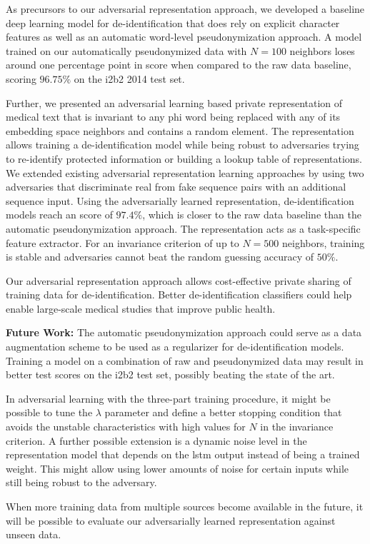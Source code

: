 %
As precursors to our adversarial representation approach, we developed a baseline deep learning model for de-identification that does rely on explicit character features as well as an automatic word-level pseudonymization approach.
%
A model trained on our automatically pseudonymized data with $N=100$ neighbors loses around one percentage point in \fone score when compared to the raw data baseline, scoring $96.75\%$ on the i2b2 2014 test set.

%
Further, we presented an adversarial learning based private representation of medical text that is invariant to any \ac{phi} word being replaced with any of its embedding space neighbors and contains a random element.
%
The representation allows training a de-identification model while being robust to adversaries trying to re-identify protected information or building a lookup table of representations.
%
We extended existing adversarial representation learning approaches by using two adversaries that discriminate real from fake sequence pairs with an additional sequence input.
%
Using the adversarially learned representation, de-identification models reach an \fone score of $97.4\%$, which is closer to the raw data baseline than the automatic pseudonymization approach.
%
The representation acts as a task-specific feature extractor.
%
For an invariance criterion of up to $N=500$ neighbors, training is stable and adversaries cannot beat the random guessing accuracy of $50\%$.

%
Our adversarial representation approach allows cost-effective private sharing of training data for de-identification.
%
Better de-identification classifiers could help enable large-scale medical studies that improve public health.

%
\textbf{Future Work:} The automatic pseudonymization approach could serve as a data augmentation scheme to be used as a regularizer for de-identification models.
%
Training a model on a combination of raw and pseudonymized data may result in better test scores on the i2b2 test set, possibly beating the state of the art.

%
In adversarial learning with the three-part training procedure, it might be possible to tune the $\lambda$ parameter and define a better stopping condition that avoids the unstable characteristics with high values for $N$ in the invariance criterion.
%
A further possible extension is a dynamic noise level in the representation model that depends on the \ac{lstm} output instead of being a trained weight.
%
This might allow using lower amounts of noise for certain inputs while still being robust to the adversary.


%
When more training data from multiple sources become available in the future, it will be possible to evaluate our adversarially learned representation against unseen data.


